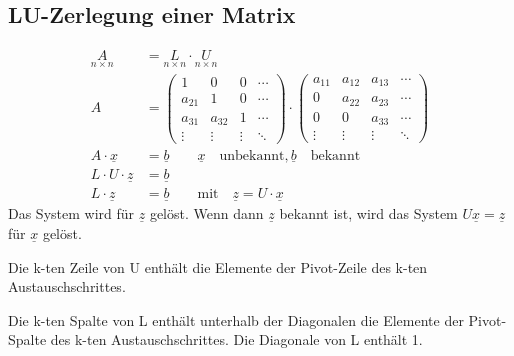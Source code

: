 \subsection{LU-Zerlegung einer Matrix}
\begin{align}
  \underset{n\times n}{A} & = \underset{n\times n}{L}\cdot\underset{n\times n}{U} \\
  A	& =	\begin{pmatrix}
			1      & 0      & 0      & \cdots \\
			a_{21} & 1      & 0      & \cdots \\
			a_{31} & a_{32} & 1      & \cdots \\
			\vdots & \vdots & \vdots & \ddots
		\end{pmatrix}
	\cdot	\begin{pmatrix}
			a_{11} & a_{12} & a_{13} & \cdots \\
			0      & a_{22} & a_{23} & \cdots \\
			0      & 0      & a_{33} & \cdots \\
			\vdots & \vdots & \vdots & \ddots
		\end{pmatrix} \\
  A\cdot \underline{x} &= \underline{b}
	\qquad\underline{x}\quad\text{unbekannt},\underline{b}\quad\text{bekannt}\\
  L\cdot U\cdot\underline{z} &= \underline{b} \\
  L\cdot\underline{z} & = \underline{b} \qquad\text{mit}\quad\underline{z} = U\cdot\underline{x}
\end{align}
Das System wird f\"ur $\underline{z}$ gel\"ost. Wenn dann $\underline{z}$
bekannt ist, wird das System $U\underline{x}=\underline{z}$ f\"ur
$\underline{x}$ gel\"ost.

Die k-ten Zeile von U enth\"alt die Elemente der Pivot-Zeile des k-ten Austauschschrittes.

Die k-ten Spalte von L enth\"alt unterhalb der Diagonalen die Elemente der Pivot-Spalte
des k-ten Austauschschrittes. Die Diagonale von L enth\"alt 1.


